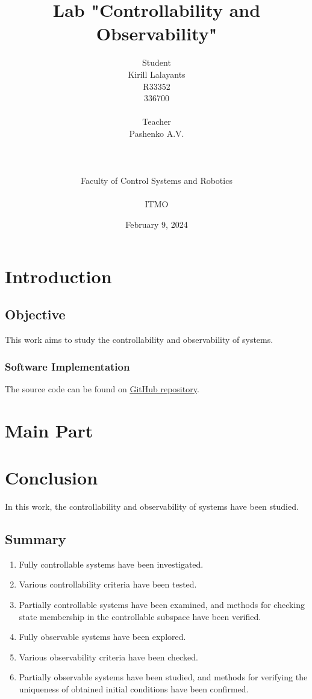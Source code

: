\documentclass[16pt]{article}
\title{Lab \textnumero 7 "Controllability and Observability"}
\author{
Student \\
Kirill Lalayants\\
R33352\\
336700\\
\\
Teacher\\
Pashenko A.V. \\
\\
\\
\\
Faculty of Control Systems and Robotics\\
\\
ITMO\\
}
\date{February 9, 2024}
\begin{document}
\maketitle
\newpage
\tableofcontents
\thispagestyle{empty}

\newpage
\setcounter{page}{1}
\section{Introduction}
\subsection{Objective}
This work aims to study the controllability and observability of systems.


\subsubsection{Software Implementation}
The source code can be found on \href{https://github.com/lalayants/control-theory-itmo-2023-2024}{GitHub repository}.
\newpage
\section{Main Part}


\newpage


\newpage



\newpage


\newpage
\section{Conclusion}
In this work, the controllability and observability of systems have been studied.
\subsection{Summary}
\begin{enumerate}
   \item Fully controllable systems have been investigated. 
   \item Various controllability criteria have been tested. 
   \item Partially controllable systems have been examined, and methods for checking state membership in the controllable subspace have been verified. 
   \item Fully observable systems have been explored. 
   \item Various observability criteria have been checked. 
   \item Partially observable systems have been studied, and methods for verifying the uniqueness of obtained initial conditions have been confirmed. 
\end{enumerate}
\end{document}
